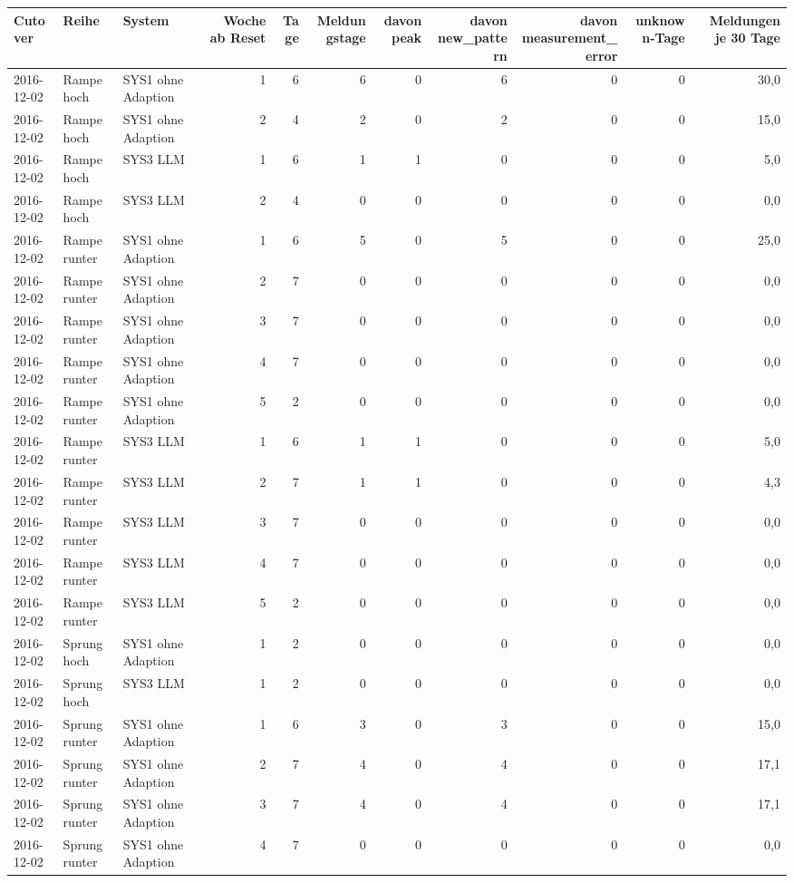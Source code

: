 \begin{tabular}{lllrrrrrrrr}
\toprule
Cutover & Reihe & System & Woche ab Reset & Tage & Meldungstage & davon peak & davon new\_pattern & davon measurement\_error & unknown-Tage & Meldungen je 30 Tage \\
\midrule
2016-12-02 & Rampe hoch & SYS1 ohne Adaption & 1 & 6 & 6 & 0 & 6 & 0 & 0 & 30,0 \\
2016-12-02 & Rampe hoch & SYS1 ohne Adaption & 2 & 4 & 2 & 0 & 2 & 0 & 0 & 15,0 \\
2016-12-02 & Rampe hoch & SYS3 LLM & 1 & 6 & 1 & 1 & 0 & 0 & 0 & 5,0 \\
2016-12-02 & Rampe hoch & SYS3 LLM & 2 & 4 & 0 & 0 & 0 & 0 & 0 & 0,0 \\
2016-12-02 & Rampe runter & SYS1 ohne Adaption & 1 & 6 & 5 & 0 & 5 & 0 & 0 & 25,0 \\
2016-12-02 & Rampe runter & SYS1 ohne Adaption & 2 & 7 & 0 & 0 & 0 & 0 & 0 & 0,0 \\
2016-12-02 & Rampe runter & SYS1 ohne Adaption & 3 & 7 & 0 & 0 & 0 & 0 & 0 & 0,0 \\
2016-12-02 & Rampe runter & SYS1 ohne Adaption & 4 & 7 & 0 & 0 & 0 & 0 & 0 & 0,0 \\
2016-12-02 & Rampe runter & SYS1 ohne Adaption & 5 & 2 & 0 & 0 & 0 & 0 & 0 & 0,0 \\
2016-12-02 & Rampe runter & SYS3 LLM & 1 & 6 & 1 & 1 & 0 & 0 & 0 & 5,0 \\
2016-12-02 & Rampe runter & SYS3 LLM & 2 & 7 & 1 & 1 & 0 & 0 & 0 & 4,3 \\
2016-12-02 & Rampe runter & SYS3 LLM & 3 & 7 & 0 & 0 & 0 & 0 & 0 & 0,0 \\
2016-12-02 & Rampe runter & SYS3 LLM & 4 & 7 & 0 & 0 & 0 & 0 & 0 & 0,0 \\
2016-12-02 & Rampe runter & SYS3 LLM & 5 & 2 & 0 & 0 & 0 & 0 & 0 & 0,0 \\
2016-12-02 & Sprung hoch & SYS1 ohne Adaption & 1 & 2 & 0 & 0 & 0 & 0 & 0 & 0,0 \\
2016-12-02 & Sprung hoch & SYS3 LLM & 1 & 2 & 0 & 0 & 0 & 0 & 0 & 0,0 \\
2016-12-02 & Sprung runter & SYS1 ohne Adaption & 1 & 6 & 3 & 0 & 3 & 0 & 0 & 15,0 \\
2016-12-02 & Sprung runter & SYS1 ohne Adaption & 2 & 7 & 4 & 0 & 4 & 0 & 0 & 17,1 \\
2016-12-02 & Sprung runter & SYS1 ohne Adaption & 3 & 7 & 4 & 0 & 4 & 0 & 0 & 17,1 \\
2016-12-02 & Sprung runter & SYS1 ohne Adaption & 4 & 7 & 0 & 0 & 0 & 0 & 0 & 0,0 \\

\end{tabular}
